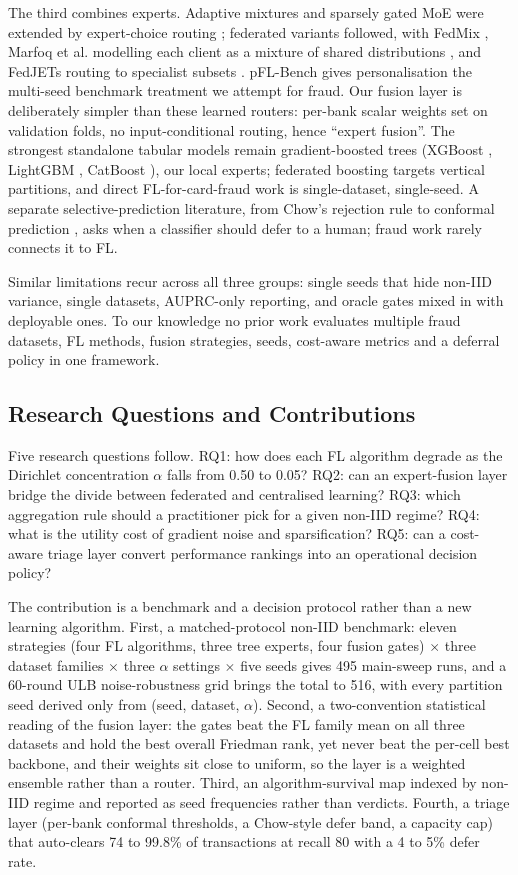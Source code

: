 \documentclass[a4paper, 10pt, conference]{ieeeconf}
\begin{document}
The third combines experts. Adaptive mixtures \cite{r14} and sparsely gated MoE
\cite{r15} were extended by expert-choice routing \cite{r16}; federated variants
followed, with FedMix \cite{r31}, Marfoq et al. modelling each client as a
mixture of shared distributions \cite{r32}, and FedJETs routing to specialist
subsets \cite{r33}. pFL-Bench \cite{r34} gives personalisation the multi-seed
benchmark treatment we attempt for fraud. Our fusion layer is deliberately
simpler than these learned routers: per-bank scalar weights set on validation
folds, no input-conditional routing, hence ``expert fusion''. The strongest
standalone tabular models remain gradient-boosted trees (XGBoost \cite{r17},
LightGBM \cite{r18}, CatBoost \cite{r19}), our local experts; federated boosting
\cite{r35} targets vertical partitions, and direct FL-for-card-fraud work
\cite{r36} is single-dataset, single-seed. A separate selective-prediction
literature, from Chow's rejection rule \cite{r29} to conformal prediction
\cite{r30}, asks when a classifier should defer to a human; fraud work rarely
connects it to FL.

Similar limitations recur across all three groups: single seeds that hide
non-IID variance, single datasets, AUPRC-only reporting, and oracle gates mixed
in with deployable ones. To our knowledge no prior work evaluates multiple fraud
datasets, FL methods, fusion strategies, seeds, cost-aware metrics and a
deferral policy in one framework.

\subsection{Research Questions and Contributions}
Five research questions follow. RQ1: how does each FL algorithm degrade as the
Dirichlet concentration $\alpha$ falls from 0.50 to 0.05? RQ2: can an
expert-fusion layer bridge the divide between federated and centralised
learning? RQ3: which aggregation rule should a practitioner pick for a given
non-IID regime? RQ4: what is the utility cost of gradient noise and
sparsification? RQ5: can a cost-aware triage layer convert performance rankings
into an operational decision policy?

The contribution is a benchmark and a decision protocol rather than a new
learning algorithm. First, a matched-protocol non-IID benchmark: eleven
strategies (four FL algorithms, three tree experts, four fusion gates) $\times$
three dataset families $\times$ three $\alpha$ settings $\times$ five seeds
gives 495 main-sweep runs, and a 60-round ULB noise-robustness grid brings the
total to 516, with every partition seed derived only from (seed, dataset,
$\alpha$). Second, a two-convention statistical reading of the fusion layer: the
gates beat the FL family mean on all three datasets and hold the best overall
Friedman rank, yet never beat the per-cell best backbone, and their weights sit
close to uniform, so the layer is a weighted ensemble rather than a router.
Third, an algorithm-survival map indexed by non-IID regime and reported as seed
frequencies rather than verdicts. Fourth, a triage layer (per-bank conformal
thresholds, a Chow-style defer band, a capacity cap) that auto-clears 74 to
99.8\% of transactions at recall 80 with a 4 to 5\% defer rate.
\end{document}
